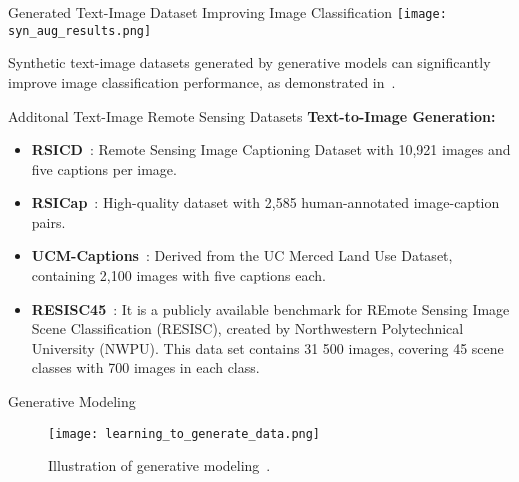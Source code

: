 \begin{refsection}
  \begin{frame}{Generated Text-Image Dataset Improving Image Classification}
    \centering
    \texttt{[image: syn\_aug\_results.png]}
    
    
    \scriptsize
    Synthetic text-image datasets generated by generative models can significantly improve image classification performance, as demonstrated in~\parencite{heSYNTHETICDATAGENERATIVE2022}.
    \bottomleftrefs
  \end{frame}
\end{refsection}

  \begin{refsection}
    \begin{frame}{Additonal Text-Image Remote Sensing Datasets}
      \textbf{Text-to-Image Generation:}
      \begin{itemize}
        \item \textbf{RSICD}~\parencite{lu2017exploring}: Remote Sensing Image Captioning Dataset with 10,921 images and five captions per image.
        \item \textbf{RSICap}~\parencite{hu2023rsgpt}: High-quality dataset with 2,585 human-annotated image-caption pairs.
        \item \textbf{UCM-Captions}~\parencite{qu2016deep}: Derived from the UC Merced Land Use Dataset, containing 2,100 images with five captions each.
        \item \textbf{RESISC45}~\parencite{Cheng2017}: It is a publicly available benchmark for REmote Sensing Image Scene Classification (RESISC), created by Northwestern Polytechnical University (NWPU). This data set contains 31 500 images, covering 45 scene classes with 700 images in each class.
      \end{itemize}
      \bottomleftrefs
    \end{frame}
  \end{refsection}

\begin{refsection}
  \begin{frame}{Generative Modeling}
    \begin{figure}
      \centering
      \texttt{[image: learning\_to\_generate\_data.png]}
      \caption{\scriptsize Illustration of generative modeling~\parencite{CVPR2023Tutorial}.}
    \end{figure}
    \bottomleftrefs
  \end{frame}
  \end{refsection}
  
